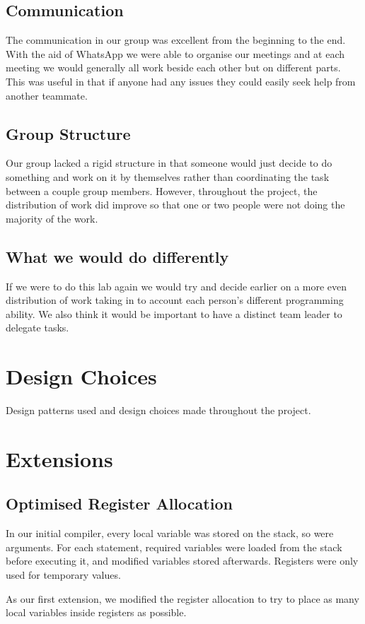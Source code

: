 \documentclass{article}
\begin{document}
\subsection{Communication}
The communication in our group was excellent from the beginning to the end. With the aid of WhatsApp we were able to organise our meetings and at each meeting we would generally all work beside each other but on different parts. This was useful in that if anyone had any issues they could easily seek help from another teammate. 

\subsection{Group Structure}
Our group lacked a rigid structure in that someone would just decide to do something and work on it by themselves rather than coordinating the task between a couple group members. However, throughout the project, the distribution of work did improve so that one or two people were not doing the majority of the work.

\subsection{What we would do differently}
If we were to do this lab again we would try and decide earlier on a more even distribution of work taking in to account each person's different programming ability. We also think it would be important to have a distinct team leader to delegate tasks.

\section{Design Choices}
Design patterns used and design choices made throughout the project.

\section{Extensions}
\subsection{Optimised Register Allocation}
In our initial compiler, every local variable was stored on the stack, so were arguments. For each statement, required variables were loaded
from the stack before executing it, and modified variables stored afterwards. Registers were only used for temporary values.

As our first extension, we modified the register allocation to try to place as many local variables inside registers as possible.
\end{document}

